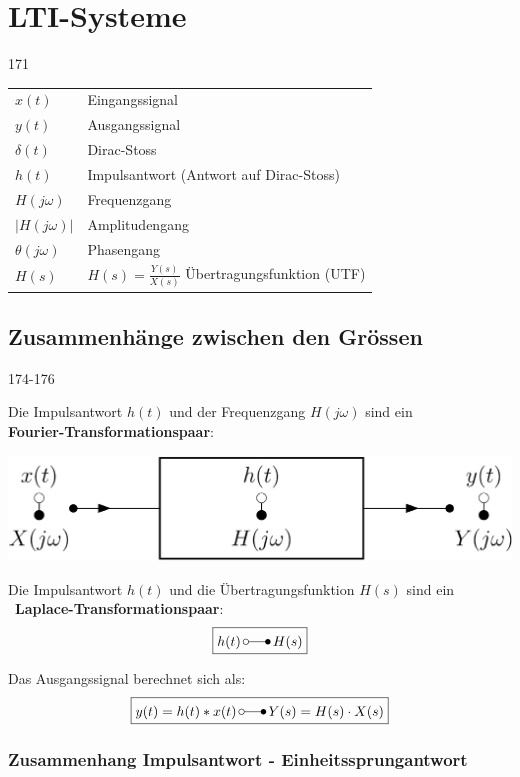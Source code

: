 \section{LTI-Systeme}{171}

\begin{tabular}{ll}
    $x(t)$              & Eingangssignal \\
    $y(t)$              & Ausgangssignal \\
    $\delta(t)$         & Dirac-Stoss \\
    $h(t)$              & Impulsantwort (Antwort auf Dirac-Stoss) \\
    $H(j \omega)$       & Frequenzgang \\
    $|H(j \omega)|$     & Amplitudengang \\
    $\theta(j \omega)$  & Phasengang \\
    $H(s)$              & $H(s) = \frac{Y(s)}{X(s)}$ Übertragungsfunktion (UTF)
\end{tabular}


\subsection{Zusammenhänge zwischen den Grössen}{174-176}\label{Zusammenhang}

Die Impulsantwort $h(t)$ und der Frequenzgang $H(j \omega)$ sind ein \\
\textbf{Fourier-Transformationspaar}:

\begin{center}
    \includegraphics[width=0.7\columnwidth]{images/frequenzgang_impulsantwort.png} \\
\end{center}

Die Impulsantwort $h(t)$ und die Übertragungsfunktion $H(s)$ sind ein\\\
\textbf{Laplace-Transformationspaar}:
$$ \boxed{ h(t) \, \laplace \, H(s) } $$

Das Ausgangssignal berechnet sich als: 
$$ \boxed{ y(t) = h(t) * x(t) \, \laplace \, Y(s) = H(s) \cdot X(s) } $$


\subsubsection{Zusammenhang Impulsantwort - Einheitssprungantwort}

